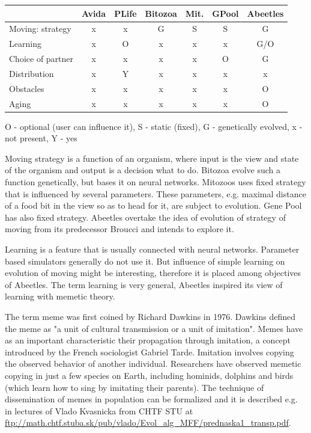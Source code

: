 \documentclass[a4paper,12pt]{report}
\begin{document}
\vspace{10pt} 
\begin{tabular}{lcccccc}
 & Avida & PLife&  Bitozoa& Mit.& GPool & Abeetles\\ \hline
Moving: strategy&x&x&G&S&S&G\\
Learning&x&O&x&x&x&G/O\\
Choice of partner&x&x&x&x&O&G\\
Distribution&x&Y&x&x&x&x\\
Obstacles&x&x&x&x&x&O\\
Aging&x&x&x&x&x&O\\
\end{tabular}
\vspace{10pt}

O - optional (user can influence it), S - static (fixed), G - genetically evolved, x - not present, Y - yes

\vspace{10pt}

Moving strategy is a function of an organism, where input is the view and state of the organism and output is a decision what to do. Bitozoa evolve such a function genetically, but bases it on neural networks. Mitozoos uses fixed strategy that is influenced by several parameters. These parameters, e.g. maximal distance of a food bit in the view so as to head for it, are subject to evolution. Gene Pool has also fixed strategy. Abeetles overtake the idea of evolution of strategy of moving from its predecessor Broucci and intends to explore it.

Learning is a feature that is usually connected with neural networks. Parameter based simulators generally do not use it. But influence of simple learning on evolution of moving might be interesting, therefore it is placed among objectives of Abeetles. The term learning is very general, Abeetles inspired its view of learning with memetic theory. 

The term meme was first coined by Richard Dawkins in 1976. Dawkins defined the meme as "a unit of cultural transmission or a unit of imitation"\cite{SelfishGene}. Memes have as an important characteristic their propagation through imitation, a concept introduced by the French sociologist Gabriel Tarde. Imitation involves copying the observed behavior of another individual. Researchers have observed memetic copying in just a few species on Earth, including hominids, dolphins and birds (which learn how to sing by imitating their parents). The technique of dissemination of memes in population can be formalized and it is described e.g. in lectures of Vlado Kvasnicka from CHTF STU at \url{ftp://math.chtf.stuba.sk/pub/vlado/Evol_alg_MFF/prednaska1_transp.pdf}.
\end{document}
